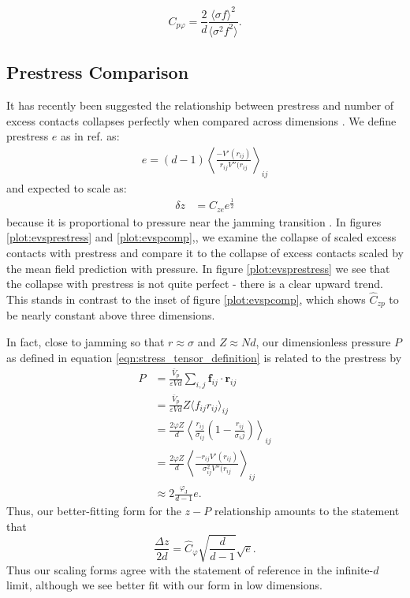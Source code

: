 \begin{equation}
    C_{p\varphi} = \frac{2}{d} \frac{ \langle \sigma f \rangle^2}{\langle \sigma^2 f^2 \rangle}.\label{eqn:seanPredictionSupp}
\end{equation}

\subsection{Prestress Comparison}

It has recently been suggested the relationship between prestress and number of excess contacts collapses perfectly when compared across dimensions \cite{shimada_low-frequency_2019}. We define prestress $e$ as in ref. \cite{shimada_low-frequency_2019} as:
%
\begin{align}
 e = \left(d-1\right) \left\langle \frac{-V'(r_{ij})}{r_{ij}V''(r_{ij}} \right\rangle_{ij}
\end{align}
%
and expected to scale as:
%
\begin{align}
 \delta z &= C_{ze} e^\frac{1}{2} \label{sup_eqn:evsprestress}
\end{align}
%
because it is proportional to pressure near the jamming transition \cite{shimada_low-frequency_2019}. In figures \ref{plot:evsprestress} and  \ref{plot:evspcomp},, we examine the collapse of scaled excess contacts with prestress and compare it to the collapse of excess contacts scaled by the mean field prediction with pressure. In figure \ref{plot:evsprestress} we see that the collapse with prestress is not quite perfect - there is a clear upward trend. This stands in contrast to the inset of figure \ref{plot:evspcomp}, which shows $\hat{C}_{zp}$ to be nearly constant above three dimensions.



In fact, close to jamming so that $r \approx \sigma$ and $Z \approx N d$, our dimensionless pressure $P$ as defined in equation \ref{eqn:stress_tensor_definition}  
is related to the prestress by
%
\begin{align} P &= \frac{\bar{V}_p}{\varepsilon Vd} \sum_{i,j} \mathbf{f}_{ij} \cdot \mathbf{r}_{ij} \\
  &=\frac{\bar{V}_p}{\varepsilon Vd} Z \langle f_{ij} r_{ij} \rangle_{ij} \\
  &=\frac{2 \varphi Z}{ d}  \left\langle \frac{r_{ij}}{\sigma_{ij}} \left(1 - \frac{r_{ij}}{\sigma_ij}\right) \right\rangle_{ij}\\
  &= \frac{2 \varphi Z}{d}  \left\langle \frac{- r_{ij} V'(r_{ij})}{\sigma_{ij}^2V''(r_{ij}} \right\rangle_{ij} \\
&\approx 2\frac{ \varphi_{\mathrm{J}} }{d-1} e.
\end{align}
%
Thus, our better-fitting form for the $z-P$ relationship amounts to the statement that
%
  \begin{equation}
    \frac{\Delta z}{2 d} =  \hat{C}_\varphi   \sqrt{\frac{d}{d-1}} \sqrt{e}.
  \end{equation}
%
 Thus our scaling forms agree with the statement of reference \cite{shimada_low-frequency_2019} in the infinite-$d$ limit, although we see better fit with our form in low dimensions.

